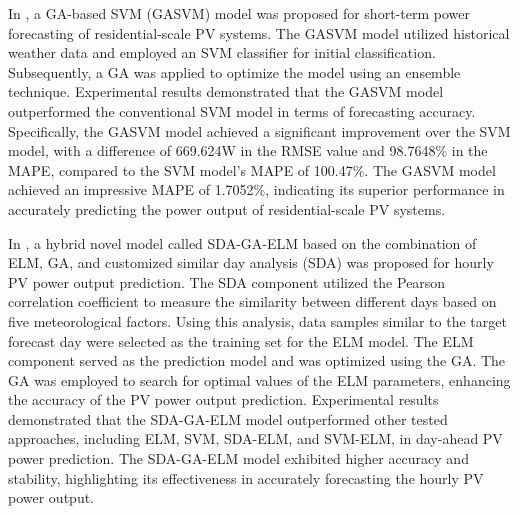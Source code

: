 In \cite{VANDEVENTER2019367}, a GA-based SVM (GASVM) model was proposed for short-term power forecasting of residential-scale PV systems.
The GASVM model utilized historical weather data and employed an SVM classifier for initial classification.
Subsequently, a GA was applied to optimize the model using an ensemble technique.
Experimental results demonstrated that the GASVM model outperformed the conventional SVM model in terms of forecasting accuracy.
Specifically, the GASVM model achieved a significant improvement over the SVM model, with a difference of 669.624W in the RMSE value and 98.7648\% in the MAPE, compared to the SVM model's MAPE of 100.47\%.
The GASVM model achieved an impressive MAPE of 1.7052\%, indicating its superior performance in accurately predicting the power output of residential-scale PV systems.

In \cite{ZHOU2020117894}, a hybrid novel model called SDA-GA-ELM based on the combination of ELM, GA, and customized similar day analysis (SDA) was proposed for hourly PV power output prediction.
The SDA component utilized the Pearson correlation coefficient to measure the similarity between different days based on five meteorological factors.
Using this analysis, data samples similar to the target forecast day were selected as the training set for the ELM model.
The ELM component served as the prediction model and was optimized using the GA.
The GA was employed to search for optimal values of the ELM parameters, enhancing the accuracy of the PV power output prediction.
Experimental results demonstrated that the SDA-GA-ELM model outperformed other tested approaches, including ELM, SVM, SDA-ELM, and SVM-ELM, in day-ahead PV power prediction.
The SDA-GA-ELM model exhibited higher accuracy and stability, highlighting its effectiveness in accurately forecasting the hourly PV power output.

